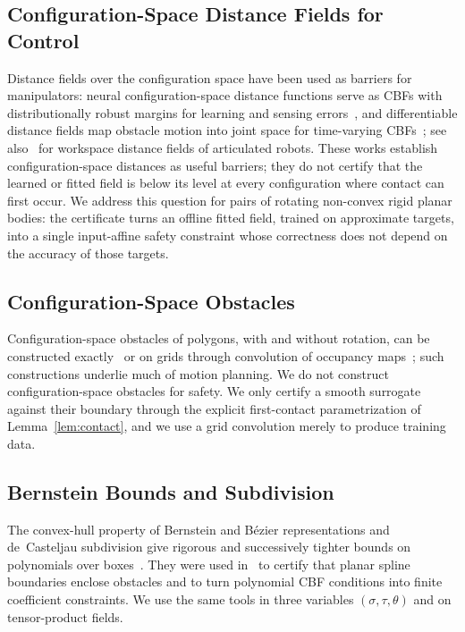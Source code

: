 \documentclass[journal]{IEEEtran}
\theoremstyle{definition}
\begin{document}
\subsection{Configuration-Space Distance Fields for Control}
Distance fields over the configuration space have been used as barriers for manipulators: neural
configuration-space distance functions serve as CBFs with distributionally robust margins for
learning and sensing errors~\cite{long2025neural}, and differentiable distance fields map obstacle
motion into joint space for time-varying CBFs~\cite{chi2024safe}; see also~\cite{li2024representing}
for workspace distance fields of articulated robots. These works establish configuration-space
distances as useful barriers; they do not certify that the learned or fitted field is below its
level at every configuration where contact can first occur. We address this question for pairs of
rotating non-convex rigid planar bodies: the certificate turns an offline fitted field, trained on
approximate targets, into a single input-affine safety constraint whose correctness does not depend
on the accuracy of those targets.

\subsection{Configuration-Space Obstacles}
Configuration-space obstacles of polygons, with and without rotation, can be constructed
exactly~\cite{lozanoperez1983spatial,latombe1991robot} or on grids through convolution of occupancy
maps~\cite{kavraki1995fft}; such constructions underlie much of motion planning. We do not construct
configuration-space obstacles for safety. We only certify a smooth surrogate against their boundary
through the explicit first-contact parametrization of Lemma~\ref{lem:contact}, and we use a grid
convolution merely to produce training data.

\subsection{Bernstein Bounds and Subdivision}
The convex-hull property of Bernstein and B\'ezier representations and de~Casteljau subdivision
give rigorous and successively tighter bounds on polynomials over
boxes~\cite{farin2002curves,sherbrooke1993computation}. They were used in~\cite{jo2027semantic} to
certify that planar spline boundaries enclose obstacles and to turn polynomial CBF conditions into
finite coefficient constraints. We use the same tools in three variables $(\sigma,\tau,\theta)$ and
on tensor-product fields.
\end{document}
